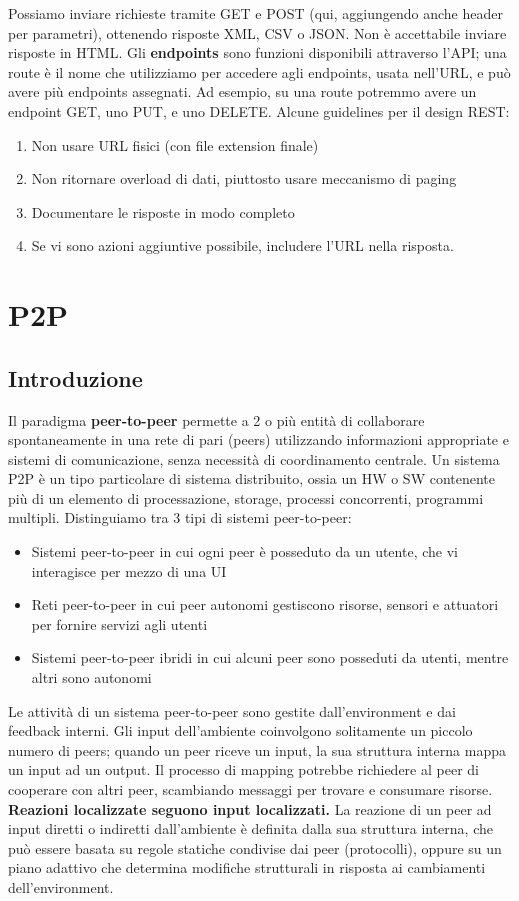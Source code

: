 \documentclass[11pt]{article}
\begin{document}
Possiamo inviare richieste tramite GET e POST (qui, aggiungendo anche header per parametri), ottenendo risposte XML, CSV o JSON. Non è accettabile inviare risposte in HTML. Gli \textbf{endpoints} sono funzioni disponibili attraverso l'API; una route è il nome che utilizziamo per accedere agli endpoints, usata nell'URL, e può avere più endpoints assegnati. Ad esempio, su una route potremmo avere un endpoint GET, uno PUT, e uno DELETE. 
Alcune guidelines per il design REST:
\begin{enumerate}
    \item Non usare URL fisici (con file extension finale)
    \item Non ritornare overload di dati, piuttosto usare meccanismo di paging 
    \item Documentare le risposte in modo completo 
    \item Se vi sono azioni aggiuntive possibile, includere l'URL nella risposta.
\end{enumerate}
\section{P2P}
\subsection{Introduzione}
Il paradigma \textbf{peer-to-peer} permette a 2 o più entità di collaborare spontaneamente in una rete di pari (peers) utilizzando informazioni appropriate e sistemi di comunicazione, senza necessità di coordinamento centrale. Un sistema P2P è un tipo particolare di sistema distribuito, ossia un HW o SW contenente più di un elemento di processazione, storage, processi concorrenti, programmi multipli. Distinguiamo tra 3 tipi di sistemi peer-to-peer:
\begin{itemize}
    \item Sistemi peer-to-peer in cui ogni peer è posseduto da un utente, che vi interagisce per mezzo di una UI 
    \item Reti peer-to-peer in cui peer autonomi gestiscono risorse, sensori e attuatori per fornire servizi agli utenti 
    \item Sistemi peer-to-peer ibridi in cui alcuni peer sono posseduti da utenti, mentre altri sono autonomi
\end{itemize}
Le attività di un sistema peer-to-peer sono gestite dall'environment e dai feedback interni. Gli input dell'ambiente coinvolgono solitamente un piccolo numero di peers; quando un peer riceve un input, la sua struttura interna mappa un input ad un output. Il processo di mapping potrebbe richiedere al peer di cooperare con altri peer, scambiando messaggi per trovare e consumare risorse. \textbf{Reazioni localizzate seguono input localizzati.}
La reazione di un peer ad input diretti o indiretti dall'ambiente è definita dalla sua struttura interna, che può essere basata su regole statiche condivise dai peer (protocolli), oppure su un piano adattivo che determina modifiche strutturali in risposta ai cambiamenti dell'environment. 
\end{document}
